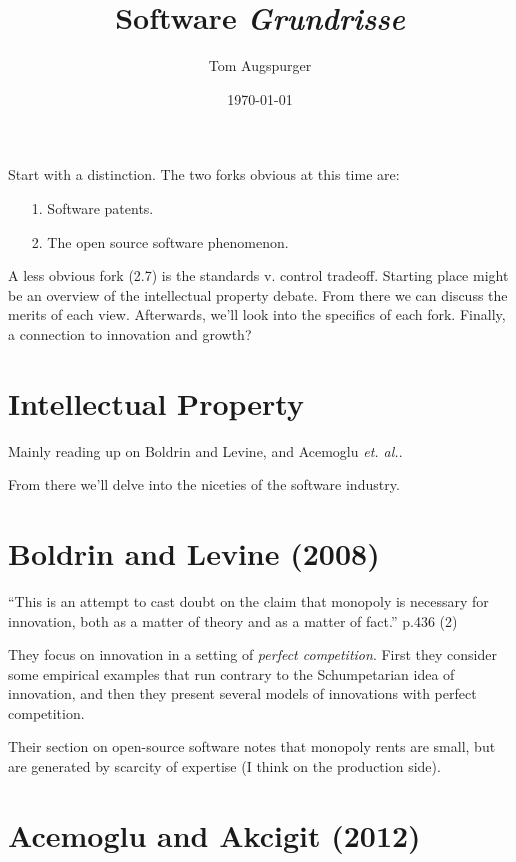 \documentclass[11pt]{article}
\title{Software \emph{Grundrisse}}
\author{Tom Augspurger}
\date{\today}
\begin{document}
\maketitle

Start with a distinction.  The two forks obvious at this time are:

\begin{itemize}
    \item[1.] Software patents.
    \item[2.] The open source software phenomenon.
\end{itemize}

A less obvious fork (2.7) is the standards v. control tradeoff. Starting place might be an overview of the intellectual property debate.  From there we can discuss the merits of each view.  Afterwards, we'll look into the specifics of each fork.  Finally, a connection to innovation and growth?

\section{Intellectual Property}
\label{sec:intellectual_property}

Mainly reading up on Boldrin and Levine, and Acemoglu \emph{et. al.}.

From there we'll delve into the niceties of the software industry.

\section{Boldrin and Levine (2008)}
\label{sec:boldrin_and_levine_}

``This is an attempt to cast doubt on the claim that monopoly is necessary for innovation, both as a matter of theory and as a matter of fact.'' p.436 (2)

They focus on innovation in a setting of \emph{perfect competition}.  First they consider some empirical examples that run contrary to the Schumpetarian idea of innovation, and then they present several models of innovations with perfect competition.

Their section on open-source software notes that monopoly rents are small, but are generated by scarcity of expertise (I think on the production side).

\section{Acemoglu and Akcigit (2012)}
\label{sec:acemoglu_and_akcigit_}
\end{document}
